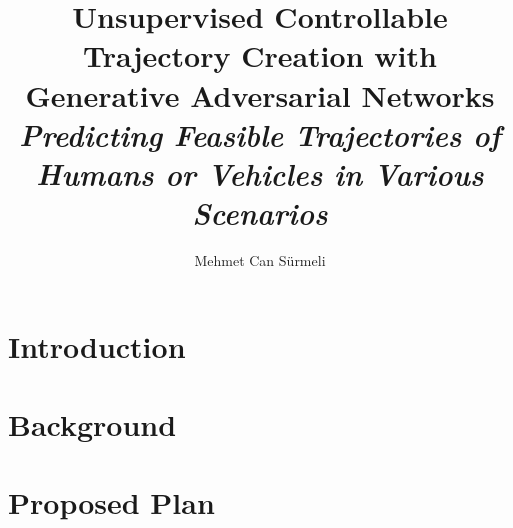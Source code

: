 \documentclass[sigconf]{acmart}
\begin{document}
	\title{Unsupervised Controllable Trajectory Creation with Generative Adversarial Networks
		\large \itshape Predicting Feasible Trajectories of Humans or Vehicles in Various Scenarios}
	
	\author{Mehmet Can Sürmeli}
	
	\begin{abstract}
	
	\end{abstract}
	
	
	\maketitle
	
	\pagestyle{plain}

	\section{Introduction}
	
	
	\section{Background}
	

	\section{Proposed Plan}
	

	
	
\end{document}
